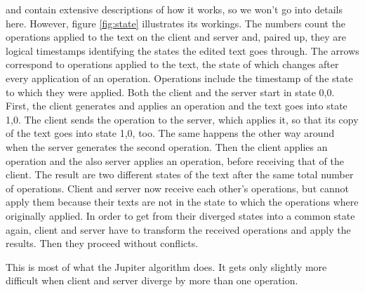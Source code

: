 \documentclass[a4paper,draft,12pt,oneside,article,table]{memoir}
\newcommand{\lining}{\setmainfont[Ligatures=TeX,Numbers=Lining]{Arno Pro}} %
\newcommand*{\state}[1]{{\lining#1}\xspace}
\begin{document}
\cite{Jupiter} and \cite{UnderstandOT} contain extensive descriptions of
how it works, so we won't go into details here. However, figure
\ref{fig:state} illustrates its workings. The numbers count the
operations applied to the text on the client and server and, paired up,
they are logical timestamps identifying the states the edited text goes
through. The arrows correspond to operations applied to the text, the
state of which changes after every application of an operation.
Operations include the timestamp of the state to which they were
applied. Both the client and the server start in state \state{0,0}.
First, the client generates and applies an operation and the text goes
into state \state{1,0}. The client sends the operation to the server,
which applies it, so that its copy of the text goes into state
\state{1,0}, too. The same happens the other way around when the server
generates the second operation. Then the client applies an operation and
the also server applies an operation, before receiving that of the
client. The result are two different states of the text after the same
total number of operations. Client and server now receive each other's
operations, but cannot apply them because their texts are not in the
state to which the operations where originally applied. In order to get
from their diverged states into a common state again, client and server
have to transform the received operations and apply the results. Then
they proceed without conflicts.

This is most of what the Jupiter algorithm does. It gets only slightly
more difficult when client and server diverge by more than one
operation.
\end{document}
